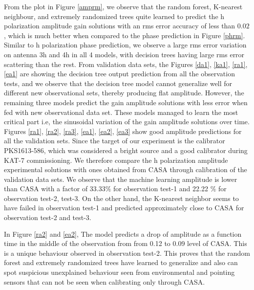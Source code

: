 From the plot in Figure \ref{amprm}, we observe that the random forest, K-nearest neighbour, and extremely randomized trees quite learned to predict the h polarization amplitude gain solutions with an rms error accuracy of less than $0.02$, which is much better when compared to the phase prediction in Figure \ref{phrm}. Similar to h polarization phase prediction, we observe a large rms error variation on antenna 3h and 4h in all 4 models, with decision trees having large rms error scattering than the rest. From validation data sets, the Figures \ref{da1}, \ref{ka1}, \ref{ra1}, \ref{ea1} are showing the decision tree output prediction from all the observation tests, and we observe that the decision tree model cannot generalize well for different new observational sets, thereby producing flat amplitude. However, the remaining three models predict the gain amplitude solutions with less error when fed with new observational data set. These models managed to learn the most critical part i.e, the sinusoidal variation of the gain amplitude solutions over time. Figures \ref{ra1}, \ref{ra2}, \ref{ra3}, \ref{ea1}, \ref{ea2}, \ref{ea3} show good amplitude predictions for all the validation sets. Since the target of our experiment is the calibrator PKS1613-586, which was considered a bright source and a good calibrator during KAT-7 commissioning. We therefore compare the h polarization amplitude experimental solutions with ones obtained from CASA through calibration of the validation data sets. We observe that the machine learning amplitude is lower than CASA with a factor of 33.33$\%$ for observation test-1 and 22.22 $\%$ for observation test-2, test-3. On the other hand, the K-nearest neighbor seems to have failed in observation test-1 and predicted approximately close to CASA for observation test-2 and test-3.

In Figure \ref{ra2} and \ref{ea2}, The model predicts a drop  of amplitude as a function time in the middle of the observation from from 0.12 to 0.09 level of CASA. This is a unique behaviour observed in observation test-2. This proves that the random forest and extremely randomized trees have learned to generalize and also can spot suspicious unexplained behaviour seen from environmental and pointing sensors that can not be seen when calibrating only through CASA.  
